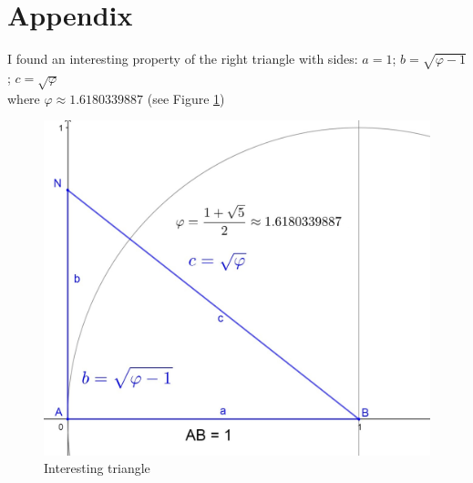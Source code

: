 \documentclass[12pt, letterpaper, oneside]{report}
\begin{document}
\newpage

\section{Appendix}

I found an interesting property of the right triangle with sides: $a=1$; $b=\sqrt{\varphi-1}$; $c=\sqrt{\varphi}$\\
where $\varphi\approx 1.6180339887$ (see Figure \ref{fig:mytriangle})
\begin{figure}[h]
	\centering
	\includegraphics[width=0.7\linewidth]{images/my_triangle.jpg}
	\caption{Interesting triangle}
	\label{fig:mytriangle}
\end{figure}
\end{document}
